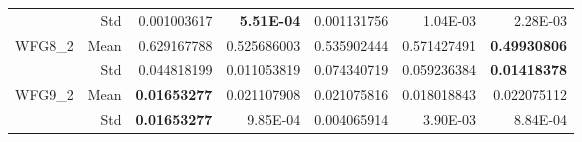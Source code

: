\begin{table*}[htbp]
\begin{tabular}{rrrrrrr}
          & Std   & 0.001003617 & \textbf{5.51E-04} & \multicolumn{1}{c}{0.001131756} & 1.04E-03 & 2.28E-03 \\
    \multirow{2}[0]{*}{WFG8\_2} & Mean  & 0.629167788 & 0.525686003 & \multicolumn{1}{c}{0.535902444} & 0.571427491 & \textbf{0.49930806} \\
          & Std   & 0.044818199 & 0.011053819 & \multicolumn{1}{c}{0.074340719} & 0.059236384 & \textbf{0.01418378} \\
    \multirow{2}[0]{*}{WFG9\_2} & Mean  & \textbf{0.01653277} & 0.021107908 & \multicolumn{1}{c}{0.021075816} & 0.018018843 & 0.022075112 \\
          & Std   & \textbf{0.01653277} & 9.85E-04 & \multicolumn{1}{c}{0.004065914} & 3.90E-03 & 8.84E-04 \\
    \bottomrule
    \end{tabular}%
  \label{tab:wfggd}%
\end{table*}%

